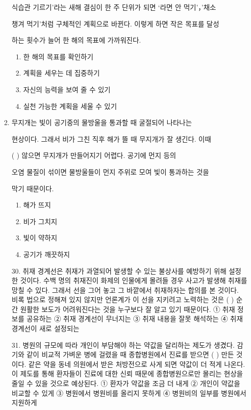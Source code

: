 \documentclass[12pt]{article}
\begin{document}
\begin{enumerate}[1.]
\begin{mdframed}
    식습관 기르기’라는 새해 결심이 한 주 단위가 되면 ‘라면 안 먹기’，'채소

    챙겨 먹기’처럼 구체적인 계획으로 바뀐다. 이렇게 하면 작은 목표를 달성

    하는 횟수가 늘어 한 해의 목표에 가까워진다.
    \end{mdframed}

    \begin{enumerate}[1)]
        \item 한 해의 목표를 확인하기
        \item 계획을 세우는 데 집중하기
        \item 자신의 능력을 보여 줄 수 있기
        \item 실천 가능한 계획을 세울 수 있기
    \end{enumerate}


    \item

    \begin{mdframed}
    무지개는 빛이 공기중의 물방울을 통과할 때 굴절되어 나타나는

    현상이다. 그래서 비가 그친 직후 해가 뜰 때 무지개가 잘 생긴다. 이때

    (      ) 않으면 무지개가 만들어지기 어렵다. 공기에 먼지 등의

    오염 물질이 섞이면 물방울들이 먼지 주위로 모여 빛이 통과하는 것을

    막기 때문이다.
    \end{mdframed}

    \begin{enumerate}[1)]
        \item 해가 뜨지
        \item 비가 그치지
        \item 빛이 약하지
        \item 공기가 깨끗하지
    \end{enumerate}


30.
  취재 경계선은 취재가 과열되어 발생할 수 있는 불상사를 예방하기
위해 설정한 것이다. 수백 명의 취재진이 화제의 인물에게 몰려들 경우
사고가 발생해 취재를 망칠 수 있다. 그래서 선을 그어 놓고 그 바깥에서
취재하자는 합의를 본 것이다. 비록 법으로 정해져 있지 않지만 언론계가
이 선을 지키려고 노력하는 것은 (      ) 순간 원활한 보도가
어려워진다는 것을 누구보다 잘 알고 있기 때문이다.
① 취재 정보를 공유하는
② 취재 경계선이 무너지는
③ 취재 내용을 잘못 해석하는
④ 취재 경계선이 새로 설정되는


31.
  병원의 규모에 따라 개인이 부담해야 하는 약값을 달리하는 제도가
생겼다. 감기와 같이 비교적 가벼운 병에 걸렸을 때 종합병원에서 진료를
받으면 (      ) 만든 것이다. 같은 약을 동네 의원에서 받은
처방전으로 사게 되면 약값이 더 적게 나온다. 이 제도를 통해 환자들이
진료에 대한 신뢰 때문에 종합병원으로만 몰리는 현상을 줄일 수 있을
것으로 예상된다.
① 환자가 약값을 조금 더 내게
② 개인이 약값을 비교할 수 있게
③ 병원에서 병원비를 올리지 못하게
④ 병원비의 일부를 병원에서 지원하게





\end{enumerate}
\end{document}
